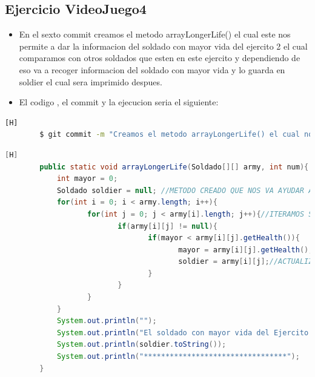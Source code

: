 \documentclass{article}
\begin{document}
	\subsection{Ejercicio VideoJuego4}
	\begin{itemize}	
		\item En el sexto commit creamos el metodo arrayLongerLife() el cual este nos permite a dar la informacion del soldado con mayor vida del ejercito 2 el cual comparamos con otros soldados que esten en este ejercito y dependiendo de eso va a recoger informacion del soldado con mayor vida y lo guarda en soldier el cual sera imprimido despues.
		\item El codigo , el commit y la ejecucion seria el siguiente:
	\end{itemize}	
	\begin{lstlisting}[language=bash,caption={Commit}][H]
		$ git commit -m "Creamos el metodo arrayLongerLife() el cual nos imprimira el dato del soldado con mayor vida dependiendo de los que esten en el ejercito que va comparando con los demas para ver quien es el mayor de todos aplicariamos la misma logica que con el metodo arrayListLongerLife() pero en este caso seria para los propios array"
	\end{lstlisting}	
	\begin{lstlisting}[language=java,caption={Las lineas de codigos del metodo creado:}][H]
		public static void arrayLongerLife(Soldado[][] army, int num){
			int mayor = 0;
			Soldado soldier = null; //METODO CREADO QUE NOS VA AYUDAR A DECIRNOS SOBRE LA INFORMACION DEL SOLDADO CON MAYOR VIDAD DEL EJERCITO2 EL CUAL TENDREMOS QUE ITERAR
			for(int i = 0; i < army.length; i++){
				   for(int j = 0; j < army[i].length; j++){//ITERAMOS SOBRE CADA SOLDADO EL CUAL COMPARAMOS CON SI ESTE ES EL MAYOR EN CUESTION DE VIDA VAMOS PASANDO POR CADA SOLDADO
						  if(army[i][j] != null){
								 if(mayor < army[i][j].getHealth()){
										mayor = army[i][j].getHealth();
										soldier = army[i][j];//ACTUALIZAMOS A ESTE SOLDADO CON EL QUE TIENE MAS VIDA DESPUES LO IMPRIMIMOS PARA VER DE QUE SOLDADO SE TRATA 
								 }
						  }
				   }
			}
			System.out.println("");
			System.out.println("El soldado con mayor vida del Ejercito " + num + " es: ");
			System.out.println(soldier.toString());
			System.out.println("*********************************");
		}
	\end{lstlisting}
\end{document}
